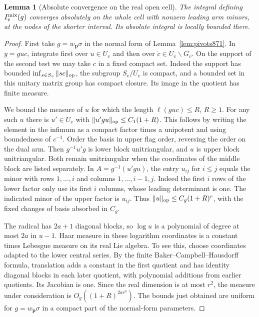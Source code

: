 \documentclass[a4paper,11pt]{article}
\newtheorem{lemma}[proposition]{Lemma}
\theoremstyle{definition}
\theoremstyle{remark}
\numberwithin{equation}{section}
\begin{document}
\begin{lemma}[Absolute convergence on the real open cell]\leavevmode
\label{lem:mixedintegral876}
The integral defining \(I_v^{\rm mix}(g)\) converges absolutely on
the whole cell with nonzero leading arm minors, at the nodes of the
shorter interval. Its absolute integral is locally bounded there.
\end{lemma}
\begin{proof}
First take \(g=w_{\mathbf p}\sigma\) in the normal form of
Lemma~\ref{lem:pivots871}. In \(y=g u c\), integrate first over
\(u\in U_v\) and then over \(\dot c\in U_v\backslash G_v\).
On the support of the second test we may take \(c\) in a fixed
compact set. Indeed the support has bounded
\(\inf_{s\in S_v}\|s c\|_{\rm op}\), the subgroup \(S_v/U_v\)
is compact, and a bounded set in this unitary matrix group has
compact closure. Its image in the quotient has finite measure.

We bound the measure of \(u\) for which the length
\(\ell(g u c)\le R\), \(R\ge1\). For any such \(u\) there is
\(u'\in U_v\) with \(\|u' g u\|_{\rm op}\le C_1(1+R)\).
This follows by writing the element in the infimum as a compact
factor times a unipotent and using boundedness of \(c^{-1}\).
Order the basis in upper flag order, reversing the order on the dual
arm. Then \(g^{-1}u'g\) is lower block unitriangular, and \(u\) is
upper block unitriangular. Both remain unitriangular when the
coordinates of the middle block are listed separately. In
\(A=g^{-1}(u' g u)\), the entry \(u_{ij}\) for \(i\le j\) equals
the minor with rows \(1,\ldots,i\) and columns \(1,\ldots,i-1,j\).
Indeed the first \(i\) rows of the lower factor only use its first
\(i\) columns, whose leading determinant is one. The indicated
minor of the upper factor is \(u_{ij}\). Thus
\(\|u\|_{\rm op}\le C_g(1+R)^r\), with the fixed changes of basis
absorbed in \(C_g\).

The radical has \(2a+1\) diagonal blocks, so \(\log u\) is a
polynomial of degree at most \(2a\) in \(u-1\). Haar measure in
these logarithm coordinates is a constant times Lebesgue measure
on its real Lie algebra. To see this, choose coordinates adapted
to the lower central series. By the finite
Baker--Campbell--Hausdorff formula, translation adds a constant
in the first quotient and has identity diagonal blocks in each
later quotient, with polynomial additions from earlier quotients.
Its Jacobian is one. Since the real dimension is at most \(r^2\),
the measure under consideration is \(O_g((1+R)^{2a r^3})\).
The bounds just obtained are uniform for \(g=w_{\mathbf p}\sigma\)
in a compact part of the normal-form parameters.


\end{proof}
\end{document}
